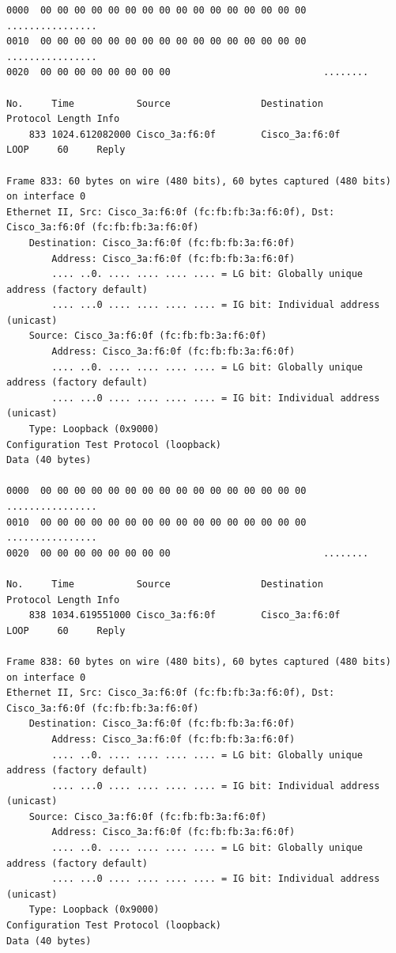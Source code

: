 \documentclass[a4paper,11pt]{article}
\begin{document}
\begin{lstlisting}
0000  00 00 00 00 00 00 00 00 00 00 00 00 00 00 00 00   ................
0010  00 00 00 00 00 00 00 00 00 00 00 00 00 00 00 00   ................
0020  00 00 00 00 00 00 00 00                           ........

No.     Time           Source                Destination           Protocol Length Info
    833 1024.612082000 Cisco_3a:f6:0f        Cisco_3a:f6:0f        LOOP     60     Reply

Frame 833: 60 bytes on wire (480 bits), 60 bytes captured (480 bits) on interface 0
Ethernet II, Src: Cisco_3a:f6:0f (fc:fb:fb:3a:f6:0f), Dst: Cisco_3a:f6:0f (fc:fb:fb:3a:f6:0f)
    Destination: Cisco_3a:f6:0f (fc:fb:fb:3a:f6:0f)
        Address: Cisco_3a:f6:0f (fc:fb:fb:3a:f6:0f)
        .... ..0. .... .... .... .... = LG bit: Globally unique address (factory default)
        .... ...0 .... .... .... .... = IG bit: Individual address (unicast)
    Source: Cisco_3a:f6:0f (fc:fb:fb:3a:f6:0f)
        Address: Cisco_3a:f6:0f (fc:fb:fb:3a:f6:0f)
        .... ..0. .... .... .... .... = LG bit: Globally unique address (factory default)
        .... ...0 .... .... .... .... = IG bit: Individual address (unicast)
    Type: Loopback (0x9000)
Configuration Test Protocol (loopback)
Data (40 bytes)

0000  00 00 00 00 00 00 00 00 00 00 00 00 00 00 00 00   ................
0010  00 00 00 00 00 00 00 00 00 00 00 00 00 00 00 00   ................
0020  00 00 00 00 00 00 00 00                           ........

No.     Time           Source                Destination           Protocol Length Info
    838 1034.619551000 Cisco_3a:f6:0f        Cisco_3a:f6:0f        LOOP     60     Reply

Frame 838: 60 bytes on wire (480 bits), 60 bytes captured (480 bits) on interface 0
Ethernet II, Src: Cisco_3a:f6:0f (fc:fb:fb:3a:f6:0f), Dst: Cisco_3a:f6:0f (fc:fb:fb:3a:f6:0f)
    Destination: Cisco_3a:f6:0f (fc:fb:fb:3a:f6:0f)
        Address: Cisco_3a:f6:0f (fc:fb:fb:3a:f6:0f)
        .... ..0. .... .... .... .... = LG bit: Globally unique address (factory default)
        .... ...0 .... .... .... .... = IG bit: Individual address (unicast)
    Source: Cisco_3a:f6:0f (fc:fb:fb:3a:f6:0f)
        Address: Cisco_3a:f6:0f (fc:fb:fb:3a:f6:0f)
        .... ..0. .... .... .... .... = LG bit: Globally unique address (factory default)
        .... ...0 .... .... .... .... = IG bit: Individual address (unicast)
    Type: Loopback (0x9000)
Configuration Test Protocol (loopback)
Data (40 bytes)


\end{lstlisting}
\end{document}
